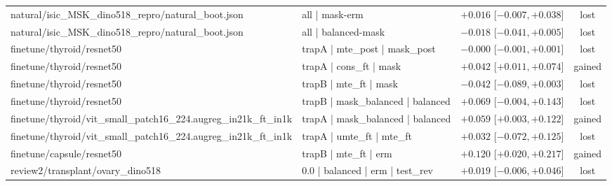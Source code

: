 \begin{table}[H]
\begin{tabular}{p{4.6cm}p{5.2cm}p{3.4cm}c}
natural/\allowbreak{}isic\_\allowbreak{}MSK\_\allowbreak{}dino518\_\allowbreak{}repro/\allowbreak{}natural\_\allowbreak{}boot.json & all  |  mask-erm & $+0.016$ [$-0.007, +0.038$] & lost \\
natural/\allowbreak{}isic\_\allowbreak{}MSK\_\allowbreak{}dino518\_\allowbreak{}repro/\allowbreak{}natural\_\allowbreak{}boot.json & all  |  balanced-mask & $-0.018$ [$-0.041, +0.005$] & lost \\
finetune/\allowbreak{}thyroid/\allowbreak{}resnet50 & trapA | mte\_\allowbreak{}post | mask\_\allowbreak{}post & $-0.000$ [$-0.001, +0.001$] & lost \\
finetune/\allowbreak{}thyroid/\allowbreak{}resnet50 & trapA | cons\_\allowbreak{}ft | mask & $+0.042$ [$+0.011, +0.074$] & gained \\
finetune/\allowbreak{}thyroid/\allowbreak{}resnet50 & trapB | mte\_\allowbreak{}ft | mask & $-0.042$ [$-0.089, +0.003$] & lost \\
finetune/\allowbreak{}thyroid/\allowbreak{}resnet50 & trapB | mask\_\allowbreak{}balanced | balanced & $+0.069$ [$-0.004, +0.143$] & lost \\
finetune/\allowbreak{}thyroid/\allowbreak{}vit\_\allowbreak{}small\_\allowbreak{}patch16\_\allowbreak{}224.augreg\_\allowbreak{}in21k\_\allowbreak{}ft\_\allowbreak{}in1k & trapA | mask\_\allowbreak{}balanced | balanced & $+0.059$ [$+0.003, +0.122$] & gained \\
finetune/\allowbreak{}thyroid/\allowbreak{}vit\_\allowbreak{}small\_\allowbreak{}patch16\_\allowbreak{}224.augreg\_\allowbreak{}in21k\_\allowbreak{}ft\_\allowbreak{}in1k & trapA | umte\_\allowbreak{}ft | mte\_\allowbreak{}ft & $+0.032$ [$-0.072, +0.125$] & lost \\
finetune/\allowbreak{}capsule/\allowbreak{}resnet50 & trapB | mte\_\allowbreak{}ft | erm & $+0.120$ [$+0.020, +0.217$] & gained \\
review2/\allowbreak{}transplant/\allowbreak{}ovary\_\allowbreak{}dino518 & 0.0 | balanced | erm | test\_\allowbreak{}rev & $+0.019$ [$-0.006, +0.046$] & lost \\
\bottomrule\end{tabular}
\end{table}
